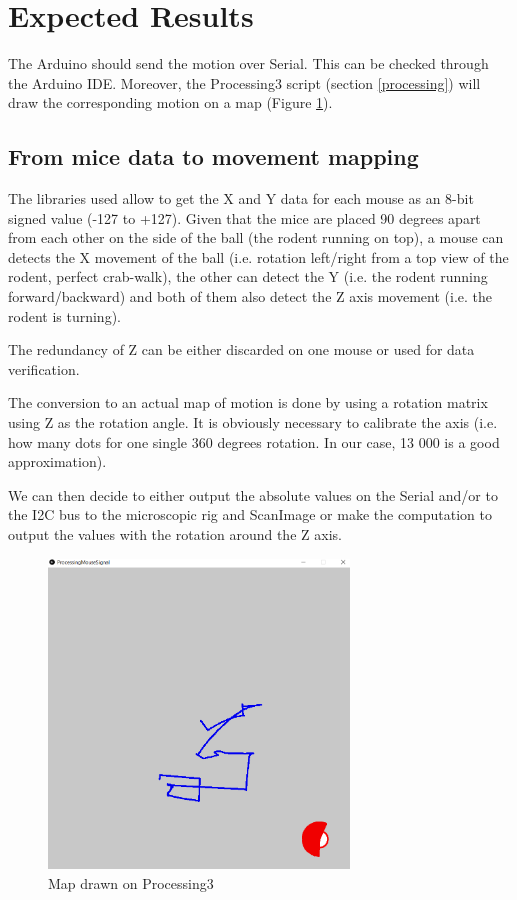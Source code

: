 \documentclass[a4paper]{article}
\begin{document}
\section{Expected Results}
The Arduino should send the motion over Serial. This can be checked through the Arduino IDE. Moreover, the Processing3 script (section \ref{processing}) will draw the corresponding motion on a map (Figure \ref{fig:procMap}).



\subsection{From mice data to movement mapping}
The libraries used allow to get the X and Y data for each mouse as an 8-bit signed value (-127 to +127). Given that the mice are placed 90 degrees apart from each other on the side of the ball (the rodent running on top), a mouse can detects the X movement of the ball (i.e. rotation left/right from a top view of the rodent, perfect crab-walk), the other can detect the Y (i.e. the rodent running forward/backward) and both of them also detect the Z axis movement (i.e. the rodent is turning). 

The redundancy of Z can be either discarded on one mouse or used for data verification.

The conversion to an actual map of motion is done by using a rotation matrix using Z as the rotation angle.
It is obviously necessary to calibrate the axis (i.e. how many dots for one single 360 degrees rotation. In our case, 13 000 is a good approximation).


We can then decide to either output the absolute values on the Serial and/or to the I2C bus to the microscopic rig and ScanImage or make the computation to output the values with the rotation around the Z axis.

\begin{figure}[h!]
    \centering
    \includegraphics[width = 8cm]{images/processingMap.PNG}
    \caption{Map drawn on Processing3}
    \label{fig:procMap}
\end{figure}
\end{document}
